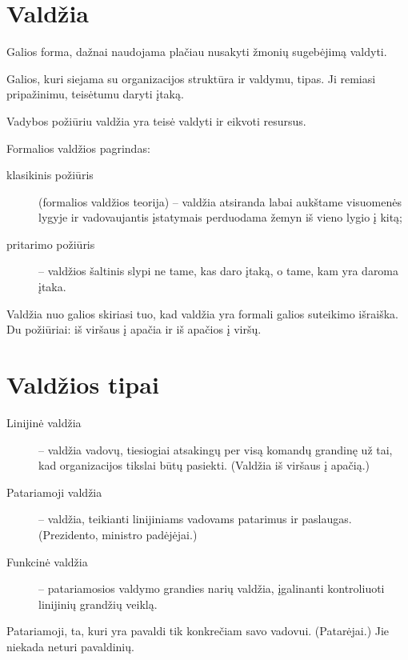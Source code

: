 \section{Valdžia}

\begin{defn}[Valdžia]
  Galios forma, dažnai naudojama plačiau nusakyti žmonių sugebėjimą
  valdyti.
\end{defn}

\begin{defn}
  Galios, kuri siejama su organizacijos struktūra ir valdymu, tipas.
  Ji remiasi pripažinimu, teisėtumu daryti įtaką.
\end{defn}

Vadybos požiūriu valdžia yra teisė valdyti ir eikvoti resursus.

Formalios valdžios pagrindas:
\begin{description}
  \item[klasikinis požiūris] (formalios valdžios teorija) – valdžia
    atsiranda labai aukštame visuomenės lygyje ir vadovaujantis
    įstatymais perduodama žemyn iš vieno lygio į kitą;
  \item[pritarimo požiūris] – valdžios šaltinis slypi ne tame, kas
    daro įtaką, o tame, kam yra daroma įtaka.
\end{description}

Valdžia nuo galios skiriasi tuo, kad valdžia yra formali galios suteikimo
išraiška. Du požiūriai: iš viršaus į apačia ir iš apačios į viršų.

\section{Valdžios tipai}

\begin{description}
  \item[Linijinė valdžia] – valdžia vadovų, tiesiogiai atsakingų per
    visą komandų grandinę už tai, kad organizacijos tikslai būtų pasiekti.
    (Valdžia iš viršaus į apačią.)
  \item[Patariamoji valdžia] – valdžia, teikianti linijiniams vadovams
    patarimus ir paslaugas. (Prezidento, ministro padėjėjai.)
  \item[Funkcinė valdžia] – patariamosios valdymo grandies narių valdžia,
    įgalinanti kontroliuoti linijinių grandžių veiklą.
\end{description}

Patariamoji, ta, kuri yra pavaldi tik konkrečiam savo vadovui. 
(Patarėjai.) Jie niekada neturi pavaldinių.


